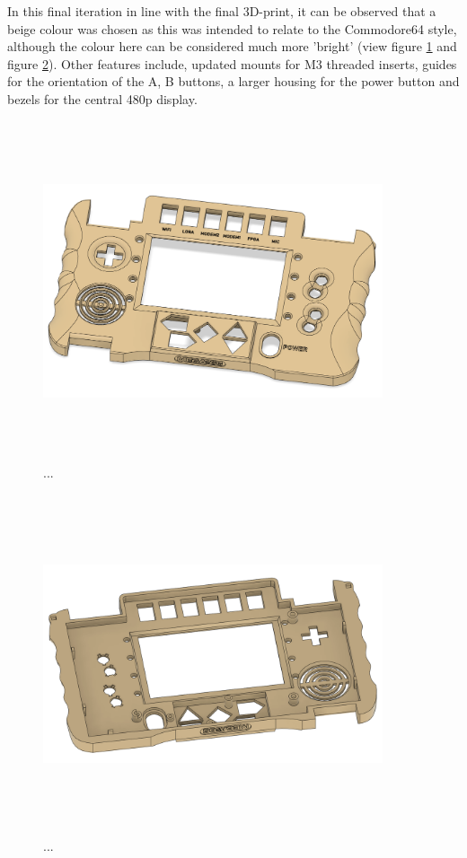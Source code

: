 In this final iteration in line with the final 3D-print, it can be observed that a beige colour was chosen as this was intended to relate to the Commodore64 style, although the colour here can be considered much more 'bright' (view figure \ref{fig:iteration4_t_f} and figure \ref{fig:iteration4_t_b}).
Other features include, updated mounts for M3 threaded inserts, guides for the orientation of the A, B buttons, a larger housing for the power button and bezels for the central 480p display.

\begin{figure} [h]
    \centering
    \includegraphics[width=10cm,height=10cm,keepaspectratio]{Figures/iteration4_top_front.png}
    \caption{...}
    \label{fig:iteration4_t_f}
\end{figure}

\begin{figure} [h]
    \centering
    \includegraphics[width=10cm,height=10cm,keepaspectratio]{Figures/iteration4_top_back.png}
    \caption{...}
    \label{fig:iteration4_t_b}
\end{figure}

